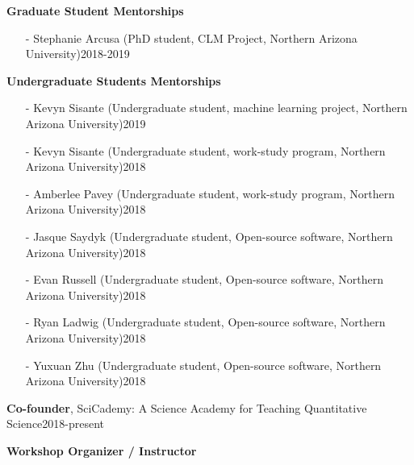 \documentclass[10pt]{article}
\newenvironment{changemargin}[2]{%
  \begin{list}{}{%
    \setlength{\topsep}{0pt}%
    \setlength{\leftmargin}{#1}%
    \setlength{\rightmargin}{#2}%
    \setlength{\listparindent}{\parindent}%
    \setlength{\itemindent}{\parindent}%
    \setlength{\parsep}{\parskip}%
  }%
  \item[]}{\end{list}
}
\newenvironment{body} {
	\vspace*{-2pt}
	\begin{changemargin}{-0.5in}{-0.5in}
  }
	{\end{changemargin}
}
\begin{document}
\begin{body}



	\textbf{Graduate Student Mentorships}\\
		\vspace*{-4pt}
		\begin{itemize} \itemsep -0pt
  		\item[-]	Stephanie Arcusa (PhD student, CLM Project, Northern Arizona University)\hfill {2018-2019}\\
  	\end{itemize}

	\medskip
	\textbf{Undergraduate Students Mentorships}\\
		\vspace*{-4pt}
		\begin{itemize} \itemsep -0pt
  		\item[-]	Kevyn Sisante (Undergraduate student, machine learning project, Northern Arizona University)\hfill {2019}\\
  		\item[-]	Kevyn Sisante (Undergraduate student, work-study program, Northern Arizona University)\hfill {2018}\\
  		\item[-]	Amberlee Pavey (Undergraduate student, work-study program, Northern Arizona University)\hfill {2018}\\
  		\item[-]	Jasque Saydyk (Undergraduate student, Open-source software, Northern Arizona University)\hfill {2018}\\
  		\item[-]	Evan Russell (Undergraduate student, Open-source software, Northern Arizona University)\hfill {2018}\\
  		\item[-]	Ryan Ladwig (Undergraduate student, Open-source software, Northern Arizona University)\hfill {2018}\\
  		\item[-]	Yuxuan Zhu (Undergraduate student, Open-source software, Northern Arizona University)\hfill {2018}\\
  	\end{itemize}

	\medskip

  	\textbf{Co-founder}, SciCademy: A Science Academy for Teaching Quantitative Science\hfill {2018-present}\\
	\medskip

  \textbf {Workshop Organizer / Instructor}\\
	\vspace*{-4pt}
		\begin{itemize} \itemsep -0pt
		

\end{itemize}
\end{body}
\end{document}
